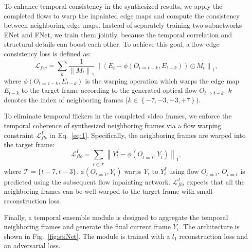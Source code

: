To enhance temporal consistency in the synthesized results, we apply the completed flows to warp the inpainted edge maps and compute the consistency between neighboring edge maps. 
%
Instead of separately training two subnetworks ENet and FNet, we train them jointly, because the temporal correlation and structural details can boost each other. 
To achieve this goal, a flow-edge consistency loss is defined as:
%
\begin{equation}
	\label{eq:flow_edge}
	\mathcal{L}_{fec}=\sum_{k}\frac{1}{\left\|M_{t} \right\|_1}\left\|(E_{t}-\phi(O_{t\Rightarrow t-k},E_{t-k}))\odot M_{t}\right\|_1,
\end{equation}
where $\phi(O_{t\Rightarrow t-k},E_{t-k})$ is the warping operation which warps the edge map $E_{t-k}$ to the target frame according to the generated optical flow $O_{t\Rightarrow t-k}$.
$k$ denotes the index of neighboring frames ($k\in \left\{-7,-3,+3,+7 \right\}$). 


To eliminate temporal flickers in the completed video frames, we enforce the temporal coherence of synthesized neighboring frames via a flow warping constraint $\mathcal{L}^I_{flo}$ in Eq.~\eqref{eq:1}. 
%
Specifically, the neighboring frames are warped into the target frame: 
\begin{equation}
\label{eq:inp_flow}
\mathcal{L}^I_{flo}=\sum_{\widehat{t}\in\mathcal{T}}\left\| Y^I_t-\phi(O_{t\Rightarrow \widehat{t}},Y_{\widehat{t}}) \right\|_1,
\end{equation}
where $\mathcal{T}=\{t-7,t-3\}$. $\phi(O_{t\Rightarrow \widehat{t}},Y_{\widehat{t}})$ warps $Y_{\widehat{t}}$ to $Y^I_{t}$ using flow $O_{t\Rightarrow \widehat{t}}$.
$O_{t\Rightarrow \widehat{t}}$ is predicted using the subsequent flow inpainting network.
$\mathcal{L}^I_{flo}$ expects that all the neighboring frames can be well warped to the target frame with small reconstruction loss.

Finally, a temporal ensemble module is designed to aggregate the temporal neighboring frames and generate the final current frame $Y_t$. The architecture is shown in Fig.~\ref{fig:stiNet}. The module is trained with a $l_1$ reconstruction loss and an adversarial loss.







